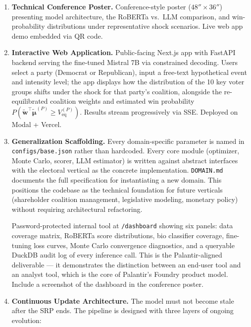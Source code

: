\documentclass[11pt]{article}
\newcommand{\veq}{V_{\mathrm{eq}}}
\newcommand{\boldmu}{\boldsymbol{\mu}}
\begin{document}
\begin{enumerate}[leftmargin=2em, itemsep=6pt]
  \item \textbf{Technical Conference Poster.}
        Conference-style poster ($48'' \times 36''$) presenting model architecture,
        the RoBERTa vs.\ LLM comparison, and win-probability distributions under
        representative shock scenarios. Live web app demo embedded via QR code.

  \item \textbf{Interactive Web Application.}
        Public-facing Next.js app with FastAPI backend serving the fine-tuned
        Mistral 7B via constrained decoding. Users select a party (Democrat or
        Republican), input a free-text hypothetical event and intensity level;
        the app displays how the distribution of the 10 key voter groups shifts
        under the shock for that party's coalition, alongside the re-equilibrated
        coalition weights and estimated win probability
        $P(\tilde{\mathbf{w}}^\top\tilde{\boldmu}^{(P)} \geq \veq^{(P)})$.
        Results stream progressively via SSE. Deployed on Modal + Vercel.

  \item \textbf{Generalization Scaffolding.}
        Every domain-specific parameter is named in \texttt{configs/base.json}
        rather than hardcoded. Every core module (optimizer, Monte Carlo, scorer,
        LLM estimator) is written against abstract interfaces with the electoral
        vertical as the concrete implementation. \texttt{DOMAIN.md} documents
        the full specification for instantiating a new domain. This positions
        the codebase as the technical foundation for future verticals
        (shareholder coalition management, legislative modeling, monetary policy)
        without requiring architectural refactoring.

        Password-protected internal tool at \texttt{/dashboard} showing six panels:
        data coverage matrix, RoBERTa score distributions, bio classifier coverage,
        fine-tuning loss curves, Monte Carlo convergence diagnostics, and a queryable
        DuckDB audit log of every inference call. This is the Palantir-aligned
        deliverable --- it demonstrates the distinction between an end-user tool and
        an analyst tool, which is the core of Palantir's Foundry product model.
        Include a screenshot of the dashboard in the conference poster.

  \item \textbf{Continuous Update Architecture.}
        The model must not become stale after the SRP ends. The pipeline is designed
        with three layers of ongoing evolution:


\end{enumerate}
\end{document}
